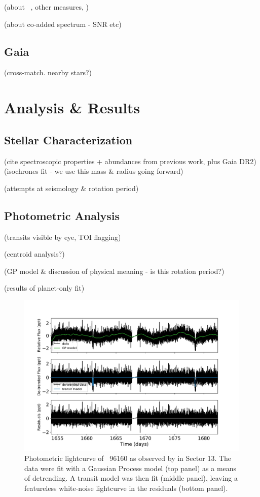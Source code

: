 \documentclass[modern]{aastex62}
\newcommand{\hoststar}{\acronym{HIP}\ 96160\xspace}
\begin{document}
(about \HARPS\ \RVs, other measures, \shk)

(about co-added spectrum - SNR etc)

\subsection{Gaia}

(cross-match. nearby stars?)

\section{Analysis \& Results}
\label{s:analysis}

\subsection{Stellar Characterization}
\label{s:analysis:star}


(cite spectroscopic properties + abundances from previous work, plus Gaia DR2)
(isochrones fit - we use this mass \& radius going forward)

(attempts at seismology \& rotation period)

\subsection{Photometric Analysis}
\label{s:analysis:photometry}


(transits visible by eye, TOI flagging)

(centroid analysis?)

(GP model \& discussion of physical meaning - is this rotation period?)

(results of planet-only fit)

\begin{figure}
    \centering
    \includegraphics[width=\textwidth]{lightcurve.pdf}
    \caption{Photometric lightcurve of \hoststar as observed by \TESS in Sector 13. The \TESS data were fit with a Gaussian Process model (top panel) as a means of detrending. A transit model was then fit (middle panel), leaving a featureless white-noise lightcurve in the residuals (bottom panel).}
    \label{fig:lightcurve}
\end{figure}
\end{document}
